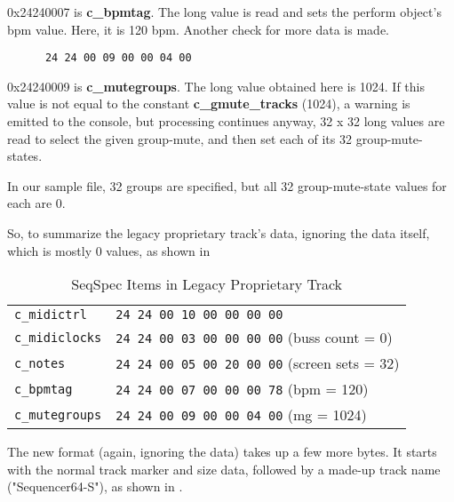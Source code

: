    0x24240007 is \textbf{c\_bpmtag}.  The long value is read and sets the
   perform object's bpm value.  Here, it is 120 bpm.
   Another check for more data is made.

   \begin{verbatim}
      24 24 00 09 00 00 04 00
   \end{verbatim}

   0x24240009 is \textbf{c\_mutegroups}.  The long value obtained here is
   1024.  If this value is not equal to the constant
   \textbf{c\_gmute\_tracks} (1024), a warning is emitted to the console,
   but processing continues anyway, 32 x 32 long values are read to select
   the given group-mute, and then set each of its 32 group-mute-states.

   In our sample file, 32 groups are specified, but all 32 group-mute-state
   values for each are 0.

   So, to summarize the legacy proprietary track's data, ignoring the data
   itself, which is mostly 0 values, as shown in

   \begin{table}[htb]
      \centering
      \caption{SeqSpec Items in Legacy Proprietary Track}
      \label{table:seqspec_items_legacy_track}
      \begin{tabular}{l l}
\texttt{c\_midictrl}    & \texttt{24 24 00 10 00 00 00 00} \\
\texttt{c\_midiclocks}  & \texttt{24 24 00 03 00 00 00 00} (buss count = 0) \\
\texttt{c\_notes}       & \texttt{24 24 00 05 00 20 00 00} (screen sets = 32) \\
\texttt{c\_bpmtag}      & \texttt{24 24 00 07 00 00 00 78} (bpm = 120) \\
\texttt{c\_mutegroups}  & \texttt{24 24 00 09 00 00 04 00} (mg = 1024) \\
      \end{tabular}
   \end{table}

   The new format (again, ignoring the data) takes up a few more bytes.
   It starts with the normal track marker and size data, followed by a
   made-up track name ("Sequencer64-S"),
   as shown in .


